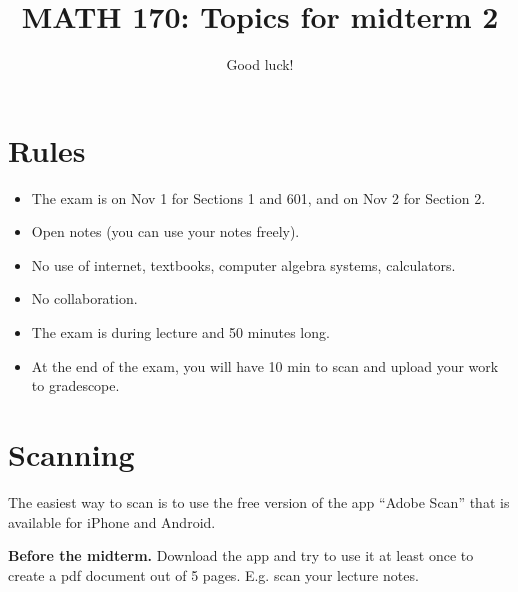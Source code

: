 \documentclass[12pt]{amsart}
\title{ MATH 170: Topics for midterm 2 }
\author{Good luck!}
\date{}
\begin{document}
\maketitle


\section*{Rules}

\begin{itemize}
    \item The exam is on Nov 1 for Sections 1 and 601, and on Nov 2 for Section 2.
    \item Open notes (you can use your notes freely).
    \item No use of internet, textbooks, computer algebra systems, calculators. 
    \item No collaboration.
    \item The exam is during lecture and 50 minutes long.
    \item At the end of the exam, you will have 10 min to scan and upload your work to gradescope.
\end{itemize}


\section*{Scanning}

The easiest way to scan is to use the free version of the app ``Adobe Scan'' that is available for iPhone and Android.

\textbf{Before the midterm.} Download the app and try to use it at least once to create a pdf document out of 5 pages. E.g. scan your lecture notes.
\end{document}
